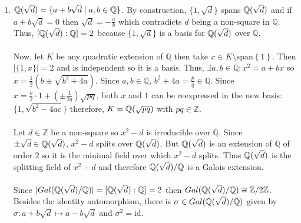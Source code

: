 \documentclass[12pt]{extarticle}
\newcommand{\Z}{\mathbb{Z}}
\newcommand{\Q}{\mathbb{Q}}
\newcommand{\quadfield}[1]{\Q \small(\sqrt{#1} \small)}
\newcommand{\vspan}[1]{\mathrm{span}\! \left\{#1 \right\}}
\newcommand{\galgroup}[1]{Gal \small(#1 \small)}
\begin{document}
\begin{enumerate}
\begin{enumerate}
\item $\quadfield{d} = \{a + b \sqrt{d} \mid a,b \in \Q \}$. By construction, $\{1, \sqrt{d}\}$ spans $\quadfield{d}$ and if $a + b\sqrt{d} = 0$ then $\sqrt{d} = -\frac{a}{b}$ which contradicts $d$ being a non-square in $\Q$. Thus, $[\quadfield{d} : \Q] = 2$ because $\{1, \sqrt{d}\}$ is a basis for $\quadfield{d}$ over $\Q$. \\ \\
Now, let $K$ be any quadratic extension of $\Q$ then take $x \in K \setminus \vspan{1}$. Then $|\{1, x\}| = 2$ and is independent so it is a basis. Thus, $\exists a,b \in \Q : x^2 = a + bx$ so $x = \frac{1}{2} (b \pm \sqrt{b^2 + 4a})$. Since $a, b \in \Q$, $b^2 + 4 a = \frac{p}{q} \in \Q$. Since $x = \frac{b}{2} \cdot 1 + (\pm \frac{1}{2q}) \sqrt{pq}$, both  $x$ and $1$ can be reexpressed in the new basis: $\{1, \sqrt{b^2-4ac} \}$ therefore, $K = \quadfield{pq}$ with $pq \in \Z$.  \\ \\
Let $d \in \Z$ be a non-square so $x^2 - d$ is irreducible over $\Q$. Since $\pm \sqrt{d} \in \quadfield{d}$, $x^2 - d$ splits over $\quadfield{d}$. But $\quadfield{d}$ is an extension of $\Q$ of order $2$ so it is the minimal field over which $x^2 - d$ splits. Thus $\quadfield{d}$ is the splitting field of $x^2 - d$ and therefore $\quadfield{d}/ \Q$ is a Galois extension.  \\ \\
Since $|\galgroup{\quadfield{d}/\Q}| = [\quadfield{d} : \Q] = 2$ then $\galgroup{\quadfield{d}/\Q} \cong \Z / 2\Z$. Besides the identity automorphism, there is $\sigma \in \galgroup{\quadfield{d}/\Q}$ given by $\sigma : a + b\sqrt{d} \mapsto a - b\sqrt{d}$ and $\sigma^2 = \mathrm{id}$.   


\end{enumerate}
\end{enumerate}
\end{document}
